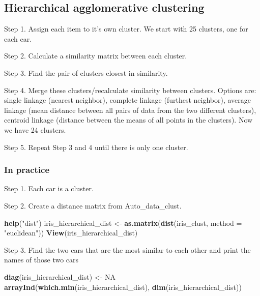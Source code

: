 \documentclass[11pt,]{article}
\newenvironment{Shaded}{\begin{snugshade}}{\end{snugshade}}
\newcommand{\DataTypeTok}[1]{\textcolor[rgb]{0.13,0.29,0.53}{#1}}
\newcommand{\KeywordTok}[1]{\textcolor[rgb]{0.13,0.29,0.53}{\textbf{#1}}}
\newcommand{\NormalTok}[1]{#1}
\newcommand{\OtherTok}[1]{\textcolor[rgb]{0.56,0.35,0.01}{#1}}
\newcommand{\StringTok}[1]{\textcolor[rgb]{0.31,0.60,0.02}{#1}}
\begin{document}
\hypertarget{hierarchical-agglomerative-clustering}{%
\subsection{Hierarchical agglomerative
clustering}\label{hierarchical-agglomerative-clustering}}

Step 1. Assign each item to it's own cluster. We start with 25 clusters,
one for each car.

Step 2. Calculate a similarity matrix between each cluster.

Step 3. Find the pair of clusters closest in similarity.

Step 4. Merge these clusters/recalculate similarity between clusters.
Options are: single linkage (nearest neighbor), complete linkage
(furthest neighbor), average linkage (mean distance between all pairs of
data from the two different clusters), centroid linkage (distance
between the means of all points in the clusters). Now we have 24
clusters.

Step 5. Repeat Step 3 and 4 until there is only one cluster.

\hypertarget{in-practice}{%
\subsubsection{In practice}\label{in-practice}}

Step 1. Each car is a cluster.

Step 2. Create a distance matrix from Auto\_data\_clust.

\begin{Shaded}
\begin{Highlighting}[]
\KeywordTok{help}\NormalTok{(}\StringTok{"dist"}\NormalTok{)}
\NormalTok{iris_hierarchical_dist <-}\StringTok{ }\KeywordTok{as.matrix}\NormalTok{(}\KeywordTok{dist}\NormalTok{(iris_clust, }\DataTypeTok{method =} \StringTok{"euclidean"}\NormalTok{))}
\KeywordTok{View}\NormalTok{(iris_hierarchical_dist)}
\end{Highlighting}
\end{Shaded}

Step 3. Find the two cars that are the most similar to each other and
print the names of those two cars

\begin{Shaded}
\begin{Highlighting}[]
\KeywordTok{diag}\NormalTok{(iris_hierarchical_dist) <-}\StringTok{ }\OtherTok{NA}
\KeywordTok{arrayInd}\NormalTok{(}\KeywordTok{which.min}\NormalTok{(iris_hierarchical_dist), }\KeywordTok{dim}\NormalTok{(iris_hierarchical_dist))}
\end{Highlighting}
\end{Shaded}
\end{document}
